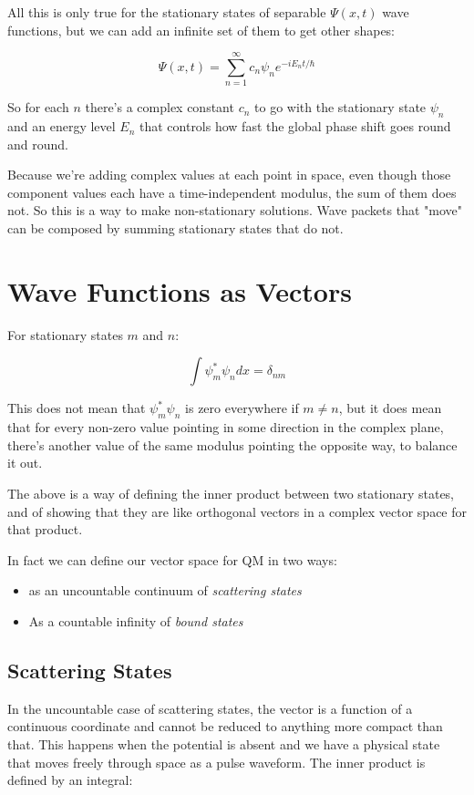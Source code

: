 All this is only true for the stationary states of separable $\Psi(x, t)$ wave functions, but we can add an infinite set of them to get other shapes:

$$
\Psi(x, t)
=
\sum_{n=1}^\infty
c_n
\psi_n
e^{-iE_nt/\hbar}
$$

So for each $n$ there's a complex constant $c_n$ to go with the stationary state $\psi_n$ and an energy level $E_n$ that controls how fast the global phase shift goes round and round.

Because we're adding complex values at each point in space, even though those component values each have a time-independent modulus, the sum of them does not. So this is a way to make non-stationary solutions. Wave packets that "move" can be composed by summing stationary states that do not.

\section{Wave Functions as Vectors}

For stationary states $m$ and $n$:

$$
\int
\psi_m^* \psi_n dx = \delta_{nm}
$$

This does not mean that $\psi_m^* \psi_n$ is zero everywhere if $m \ne n$, but it does mean that for every non-zero value pointing in some direction in the complex plane, there's another value of the same modulus pointing the opposite way, to balance it out.

The above is a way of defining the inner product between two stationary states, and of showing that they are like orthogonal vectors in a complex vector space for that product.

In fact we can define our vector space for QM in two ways:

\begin{itemize}
  \item as an uncountable continuum of \textit{scattering states}
  \item As a countable infinity of \textit{bound states}
\end{itemize}

\subsection{Scattering States}

In the uncountable case of scattering states, the vector is a function of a continuous coordinate and cannot be reduced to anything more compact than that. This happens when the potential is absent and we have a physical state that moves freely through space as a pulse waveform. The inner product is defined by an integral:

